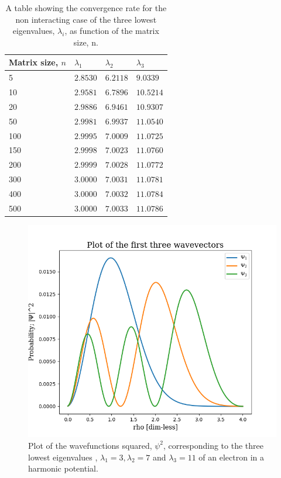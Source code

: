 \documentclass[12pt]{article}
\numberwithin{figure}{section}
\numberwithin{table}{section}
\begin{document}
\begin{table}[h]
\begin{center}
  \begin{tabular}{| l | l | l | l |}
  \hline
    Matrix size, $n$ &  $\lambda_1$ & $\lambda_2$ & $\lambda_3$ \\[0.10cm] \hline
     5 & $2.8530$ & $6.2118$ & $9.0339$\\[0.10cm]
    10 & $2.9581$ & $6.7896$& $10.5214$\\[0.10cm]
    20 & $2.9886$& $6.9461$& $10.9307$\\[0.10cm]
    50 & $2.9981$& $6.9937$& $11.0540$\\[0.10cm]
    100 & $2.9995$& $7.0009$& $11.0725$\\[0.10cm]
    150 & $2.9998$& $7.0023$& $11.0760$\\[0.10cm]
    200 & $2.9999$& $7.0028$& $11.0772$\\[0.10cm]
    300 & $3.0000$ & $7.0031$& $11.0781$\\[0.10cm]
    400 & $3.0000$ & $7.0032$& $11.0784$\\[0.10cm]
    500 & $3.0000$ & $7.0033$& $11.0786$\\[0.10cm]
     \hline
  \end{tabular}
\end{center}
\caption{A table showing the convergence rate for the non interacting case of the three lowest eigenvalues, $\lambda_i$, as function of the matrix size, n.}
\label{tab:convergence}
\end{table}  

\begin{figure}[ht]
	\centerline{\includegraphics[scale = 0.9]{wavefunc_nonint.png}}
	\caption{Plot of the wavefunctions squared, $\psi^2$, corresponding to the three lowest eigenvalues , $\lambda_1=3, \lambda_2=7$ and $\lambda_3=11$ of an electron in a harmonic potential.}
    \label{fig:non}
\end{figure}
\end{document}
